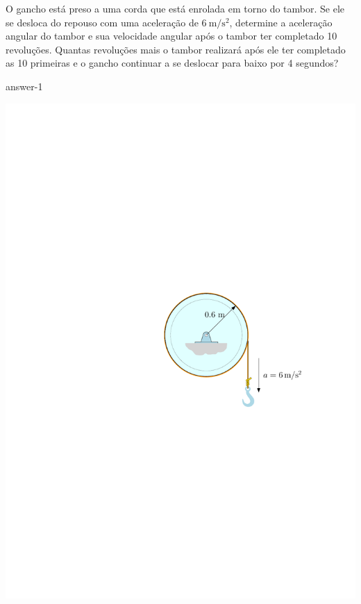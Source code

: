 \item O gancho está preso a uma corda que está enrolada em torno do tambor. Se ele se desloca do repouso com uma aceleração de $\SI{6}{\meter/\second^{2}}$, determine a aceleração angular do tambor e sua velocidade angular após o tambor ter completado 10 revoluções. Quantas revoluções mais o tambor realizará após ele ter completado as 10 primeiras e o gancho continuar a se deslocar para baixo por 4 segundos?

{answer-1}

\vspace{-2.8cm}
\begin{flushright}
	\includegraphics[scale=1]{images/draw_1}
\end{flushright}
